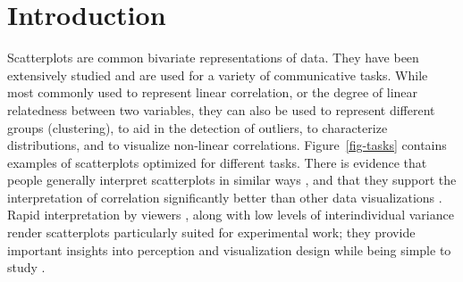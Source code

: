 \documentclass[manuscript, review, anonymous, screen]{acmart}
\begin{document}


\maketitle

\setlength{\parskip}{-0.1pt}

\hypertarget{introduction}{%
\section{Introduction}\label{introduction}}

Scatterplots are common bivariate representations of data. They have
been extensively studied and are used for a variety of communicative
tasks. While most commonly used to represent linear correlation, or the
degree of linear relatedness between two variables, they can also be
used to represent different groups (clustering), to aid in the detection
of outliers, to characterize distributions, and to visualize non-linear
correlations. Figure~\ref{fig-tasks} contains examples of scatterplots
optimized for different tasks. There is evidence that people generally
interpret scatterplots in similar ways \citep{kay_2015}, and that they
support the interpretation of correlation significantly better than
other data visualizations \citep{li_2010}. Rapid interpretation by
viewers \citep{rensink_2014}, along with low levels of interindividual
variance render scatterplots particularly suited for experimental work;
they provide important insights into perception and visualization design
while being simple to study \citep{rensink_2014}.
\end{document}
